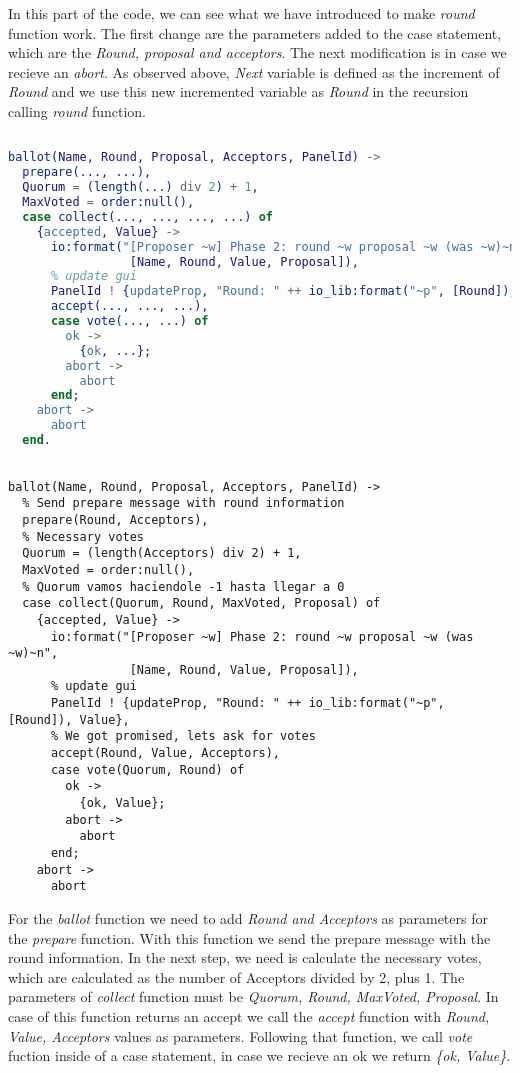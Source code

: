 \documentclass[a4paper, 10pt]{article}
\begin{document}
  In this part of the code, we can see what we have introduced to make \textit{round} function work. The first change are the parameters added to the case statement, which are the \textit{Round, proposal and acceptors}. The next modification is in case we recieve an \textit{abort}. As observed above, \textit{Next} variable is defined as the increment of \textit{Round} and we use this new incremented variable as \textit{Round} in the recursion calling \textit{round} function. 
 

\begin{lstlisting}[language=erlang]
  
ballot(Name, Round, Proposal, Acceptors, PanelId) ->
  prepare(..., ...),
  Quorum = (length(...) div 2) + 1,
  MaxVoted = order:null(),
  case collect(..., ..., ..., ...) of
    {accepted, Value} ->
      io:format("[Proposer ~w] Phase 2: round ~w proposal ~w (was ~w)~n", 
                 [Name, Round, Value, Proposal]),
      % update gui
      PanelId ! {updateProp, "Round: " ++ io_lib:format("~p", [Round]), Value},
      accept(..., ..., ...),
      case vote(..., ...) of
        ok ->
          {ok, ...};
        abort ->
          abort
      end;
    abort ->
      abort
  end.
\end{lstlisting}

\begin{lstlisting}
  
ballot(Name, Round, Proposal, Acceptors, PanelId) ->
  % Send prepare message with round information
  prepare(Round, Acceptors),
  % Necessary votes
  Quorum = (length(Acceptors) div 2) + 1,
  MaxVoted = order:null(),
  % Quorum vamos haciendole -1 hasta llegar a 0
  case collect(Quorum, Round, MaxVoted, Proposal) of
    {accepted, Value} ->
      io:format("[Proposer ~w] Phase 2: round ~w proposal ~w (was ~w)~n", 
                 [Name, Round, Value, Proposal]),
      % update gui
      PanelId ! {updateProp, "Round: " ++ io_lib:format("~p", [Round]), Value},
      % We got promised, lets ask for votes
      accept(Round, Value, Acceptors),
      case vote(Quorum, Round) of
        ok ->
          {ok, Value};
        abort ->
          abort
      end;
    abort ->
      abort
\end{lstlisting}

For the \textit{ballot} function we need to add \textit{Round and Acceptors} as parameters for the \textit{prepare} function. With this function we send the prepare message with the round information. In the next step, we need is calculate the necessary votes, which are calculated as the number of Acceptors divided by 2, plus 1. The parameters of \textit{collect} function must be \textit{Quorum, Round, MaxVoted, Proposal}. In case of this function returns an accept we call the \textit{accept} function with \textit{Round, Value, Acceptors} values as parameters. Following that function, we call \textit{vote} fuction inside of a case statement, in case we recieve an ok we return \textit{\{ok, Value\}}.
\end{document}
